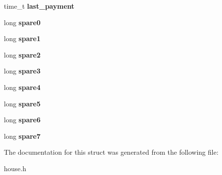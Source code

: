 \begin{DoxyCompactItemize}
time\+\_\+t {\bfseries last\+\_\+payment}
\item 
\mbox{\label{structhouse__control__rec_a9f58373140fbe4c322ef9ddd72e2c14c}} 
long {\bfseries spare0}
\item 
\mbox{\label{structhouse__control__rec_ac1b576a26d8add2b81d1908bce1da09a}} 
long {\bfseries spare1}
\item 
\mbox{\label{structhouse__control__rec_a315e06b6e8305607ef4c1a4b4d02e709}} 
long {\bfseries spare2}
\item 
\mbox{\label{structhouse__control__rec_a66620a16f2a27ed1d2f63fe2e81166b9}} 
long {\bfseries spare3}
\item 
\mbox{\label{structhouse__control__rec_af42eaf2cc9b3b3f68465e779cbb19438}} 
long {\bfseries spare4}
\item 
\mbox{\label{structhouse__control__rec_a7a5e6a7140cd21069ea484d415522970}} 
long {\bfseries spare5}
\item 
\mbox{\label{structhouse__control__rec_a56a1799fd4487bf63e615476b9a94bb8}} 
long {\bfseries spare6}
\item 
\mbox{\label{structhouse__control__rec_a2fe0851dafbdc8b81ef45facbd673cfc}} 
long {\bfseries spare7}
\end{DoxyCompactItemize}


The documentation for this struct was generated from the following file\+:\begin{DoxyCompactItemize}
\item 
house.\+h\end{DoxyCompactItemize}
